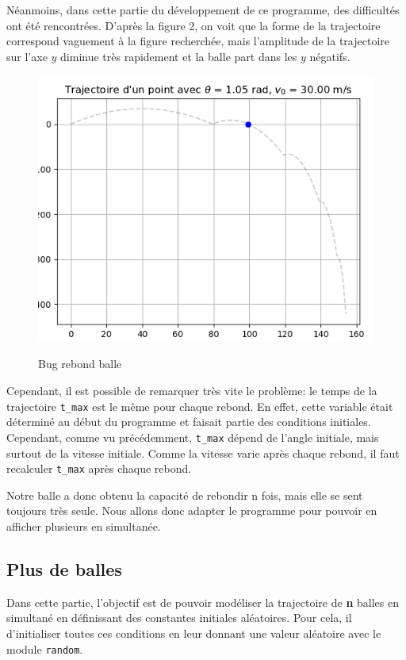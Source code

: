 \documentclass[a4paper,11pt]{article}
\begin{document}
Néanmoins, dans cette partie du développement de ce programme, des difficultés ont été rencontrées. D'après la figure 2, on voit que la forme de la trajectoire correspond vaguement à la figure recherchée, mais l'amplitude de la trajectoire sur l'axe $y$ diminue très rapidement et la balle part dans les $y$ négatifs.

\begin{figure}[H]
	\centering
	\includegraphics[scale=0.4]{bug_classe_rebond.png}
	\label{fig:bug_reb} \caption{Bug rebond balle}
\end{figure}

Cependant, il est possible de remarquer très vite le problème: le temps de la trajectoire \verb|t_max| est le même pour chaque rebond. En effet, cette variable était déterminé au début du programme et faisait partie des conditions initiales. Cependant, comme vu précédemment, \verb|t_max| dépend de l'angle initiale, mais surtout de la vitesse initiale. Comme la vitesse varie après chaque rebond, il faut recalculer \verb|t_max| après chaque rebond.

Notre balle a donc obtenu la capacité de rebondir n fois, mais elle se sent toujours très seule. Nous allons donc adapter le programme pour pouvoir en afficher plusieurs en simultanée.


\subsection{Plus de balles}

Dans cette partie, l'objectif est de pouvoir modéliser la trajectoire de \textbf{n} balles en simultané en définissant des constantes initiales aléatoires. Pour cela, il d'initialiser toutes ces conditions en leur donnant une valeur aléatoire avec le module \verb|random|.
\end{document}
